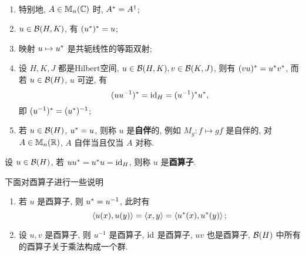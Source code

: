     \begin{Remark}~
        \begin{enumerate}[(1)]
            \item 特别地, $ A\in\mathbb{M}_{n}(\mathbb{C}) $ 时, $ A^{*}=A^{\dagger} $;
            \item $ u\in\mathcal{B}(H, K) $, 有 $ (u^{*})^{*}=u $;
            \item 映射 $ u\mapsto u^{*} $ 是共轭线性的等距双射;
            \item 设 $ H, K, J $ 都是Hilbert空间, $ u\in\mathcal{B}(H, K), v\in\mathcal{B}(K, J) $, 则有 $ (vu)^{*}=u^{*}v^{*} $, 而若 $ u\in\mathcal{B}(H) $, $ u $ 可逆, 有
            \[
                (uu^{-1})^{*}=\mathrm{id}_{H}=(u^{-1})^{*}u^{*},
            \]
            即 $ (u^{-1})^{*}=(u^{*})^{-1} $;
            \item 若 $ u\in\mathcal{B}(H) $, $ u^{*}=u $, 则称 $ u $ 是\textbf{自伴}的, 例如 $ M_{g}: f\mapsto gf $ 是自伴的, 对 $ A\in\mathbb{M}_{n}(\mathbb{R}) $, $ A $ 自伴当且仅当 $ A $ 对称.
        \end{enumerate}
    \end{Remark}
    \begin{Definition}[酉算子]\label{def:酉算子}
             设 $ u\in \mathcal{B}(H) $, 若 $ uu^{*}=u^{*}u=\mathrm{id}_{H} $, 则称 $ u $ 是\textbf{酉算子}.
    \end{Definition}
    \begin{Remark}
        下面对酉算子进行一些说明
        \begin{enumerate}[(1)]
            \item 若 $ u $ 是酉算子, 则 $ u^{*}=u^{-1} $, 此时有
            \[
                \left\langle u(x), u(y) \right\rangle=\left\langle x, y \right\rangle=\left\langle u^{*}(x), u^{*}(y) \right\rangle;
            \]
            \item 设 $ u, v $ 是酉算子, 则 $ u^{-1} $ 是酉算子, $ \mathrm{id} $ 是酉算子, $ uv $ 也是酉算子, $ \mathcal{B}(H) $ 中所有的酉算子关于乘法构成一个群.
        \end{enumerate}
    \end{Remark}

